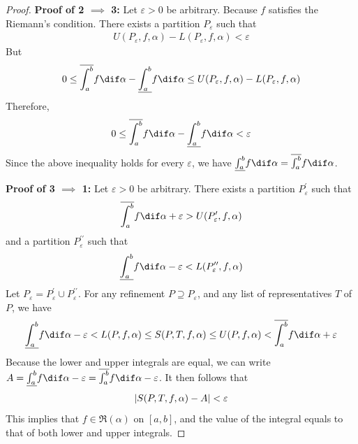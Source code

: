 \documentclass[thmcnt=section, color=blue, 12pt]{my-elegantbook}
\begin{document}
\begin{proof}
	\noindent\textbf{Proof of 2 $\implies$ 3:}
	Let $\varepsilon > 0$ be arbitrary.
	Because $f$ satisfies the Riemann's condition.
	There exists a partition $P_\varepsilon$ such that
	\begin{align*}
		U(P_\varepsilon, f, \alpha) - L(P_\varepsilon, f, \alpha) < \varepsilon
	\end{align*}
	But
	\begin{align*}
		0 \leq \overline{\int_a^b} f \dif \alpha
		- \underline{\int_a^b} f \dif \alpha
		\leq U(P_\varepsilon, f, \alpha) - L(P_\varepsilon, f, \alpha)
	\end{align*}
	Therefore,
	\begin{align*}
		0 \leq \overline{\int_a^b} f \dif \alpha
		- \underline{\int_a^b} f \dif \alpha < \varepsilon
	\end{align*}
	Since the above inequality holds for every $\varepsilon$,
	we have $ \underline{\int_a^b} f \dif \alpha = \overline{\int_a^b} f \dif \alpha$.


	\noindent\textbf{Proof of 3 $\implies$ 1:}
	Let $\varepsilon > 0$ be arbitrary.
	There exists a partition $P_\varepsilon^\prime$ such that
	\begin{align*}
		\overline{\int_a^b} f \dif \alpha + \varepsilon
		> U(P_\varepsilon^\prime, f, \alpha)
	\end{align*}
	and a partition $P_\varepsilon^{\prime\prime}$ such that
	\begin{align*}
		\underline{\int_a^b} f \dif \alpha - \varepsilon
		< L(P_\varepsilon^{\prime\prime}, f, \alpha)
	\end{align*}
	Let $P_\varepsilon = P_\varepsilon^\prime \cup P_\varepsilon^{\prime\prime}$.
	For any refinement $P \supseteq P_\varepsilon$,
	and any list of representatives $T$ of $P$,
	we have
	\begin{align*}
		\underline{\int_a^b} f \dif \alpha - \varepsilon
		< L(P, f, \alpha)
		\leq S(P, T, f, \alpha)
		\leq U(P, f, \alpha)
		< \overline{\int_a^b} f \dif \alpha + \varepsilon
	\end{align*}
	Because the lower and upper integrals are equal,
	we can write $A = \underline{\int_a^b} f \dif \alpha - \varepsilon = \overline{\int_a^b} f \dif \alpha - \varepsilon$.
	It then follows that
	\begin{align*}
		\left\lvert  S(P, T, f, \alpha) - A  \right\rvert < \varepsilon
	\end{align*}
	This implies that $f \in \mathfrak{R}(\alpha)$ on $[a, b]$,
	and the value of the integral
	equals to that of both lower and upper integrals.
\end{proof}
\end{document}
